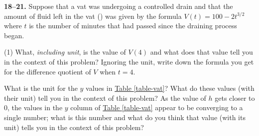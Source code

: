 \documentclass[10pt,oneside,]{book}
\theoremstyle{plain}
\theoremstyle{definition}
\numberwithin{equation}{section}
\newcommand{\hrulemedium}{\noalign{\hrule height 0.07em}}
\newcommand{\hrulethick} {\noalign{\hrule height 0.11em}}
\newcounter{figstack}
\newcounter{figindex}
\newlength\fight
\newcommand\pushValignCaptionBottom[5][b]{%
\stepcounter{figstack}%
\expandafter\def\csname %
figalign\romannumeral\value{figstack}\endcsname{#1}%
\expandafter\def\csname %
figtype\romannumeral\value{figstack}\endcsname{#2}%
\expandafter\def\csname %
figwd\romannumeral\value{figstack}\endcsname{#3}%
\expandafter\def\csname %
figcontent\romannumeral\value{figstack}\endcsname{#4}%
\expandafter\def\csname %
figcap\romannumeral\value{figstack}\endcsname{#5}%
\setbox0=\hbox{%
\begin{#2}{#3}#4\end{#2}}%
\ifdim\dimexpr\ht0+\dp0\relax>\fight\global\setlength{\fight}{%
\dimexpr\ht0+\dp0\relax}\fi%
}
\newcommand\popValignCaptionBottom{%
\setcounter{figindex}{0}%
\hfill%
\whiledo{\value{figindex}<\value{figstack}}{%
\stepcounter{figindex}%
\def\tmp{\csname figwd\romannumeral\value{figindex}\endcsname}%
\begin{\csname figtype\romannumeral\value{figindex}\endcsname}[t]{\tmp}%
\centering%
\stackinset{c}{}%
{\csname figalign\romannumeral\value{figindex}\endcsname}{}%
{\csname figcontent\romannumeral\value{figindex}\endcsname}%
{\rule{0pt}{\fight}}\par%
\csname figcap\romannumeral\value{figindex}\endcsname%
\end{\csname figtype\romannumeral\value{figindex}\endcsname}%
\hfill%
}%
\setcounter{figstack}{0}%
\setlength{\fight}{0pt}%
\hfill%
}
\newcommand{\fe}[2]{#1\mathopen{}\left(#2\right)\mathclose{}}
\begin{document}
\par\smallskip\noindent
\textbf{18--21. }\hypertarget{exercisegroup-vat}{\null}Suppose that a vat was undergoing a controlled drain and that the amount of fluid left in the vat (\si{\gallon}) was given by the formula \(\fe{V}{t}=100-2t^{3/2}\) where \(t\) is the number of minutes that had passed since the draining process began.%
\par
\begin{exercisegroup}(1)
\exercise[18.]\hypertarget{exercise-vat-first}{\null}What, \emph{including unit}, is the value of \(\fe{V}{4}\) and what does that value tell you in the context of this problem?%
\exercise[19.]\hypertarget{exercise-27}{\null}Ignoring the unit, write down the formula you get for the difference quotient of \(V\) when \(t=4\).%
\exercise[20.]\hypertarget{exercise-28}{\null}What is the unit for the \(y\) values in \hyperref[table-vat]{Table \ref{table-vat}}? What do these values (with their unit) tell you in the context of this problem?%
\exercise[21.]\hypertarget{exercise-vat-last}{\null}As the value of \(h\) gets closer to \(0\), the values in the \(y\) column of \hyperref[table-vat]{Table \ref{table-vat}} appear to be converging to a single number; what is this number and what do you think that value (with its unit) tells you in the context of this problem?%
\end{exercisegroup}
\par\smallskip\noindent
\typeout{************************************************}
\typeout{************************************************}
\end{document}
